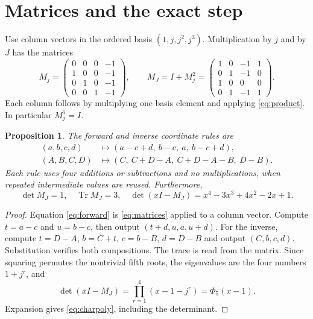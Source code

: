 \documentclass[11pt,a4paper]{article}
\newtheorem{proposition}{Proposition}
\newcommand{\Tr}{\operatorname{Tr}}
\begin{document}
\section{Matrices and the exact step}\label{sec:step}
Use column vectors in the ordered basis $(1,j,j^2,j^3)$. Multiplication
by $j$ and by $J$ has the matrices
\begin{equation}\label{eq:matrices}
 M_j=\begin{pmatrix}
 0&0&0&-1\\1&0&0&-1\\0&1&0&-1\\0&0&1&-1
 \end{pmatrix},\qquad
 M_J=I+M_j^2=\begin{pmatrix}
 1&0&-1&1\\0&1&-1&0\\1&0&0&0\\0&1&-1&1
 \end{pmatrix}.
\end{equation}
Each column follows by multiplying one basis element and applying
\eqref{eq:product}. In particular $M_j^5=I$.

\begin{proposition}\label{prop:step}
The forward and inverse coordinate rules are
\begin{align}
 (a,b,c,d)&\longmapsto(a-c+d,\ b-c,\ a,\ b-c+d),\label{eq:forward}\\
 (A,B,C,D)&\longmapsto(C,\ C+D-A,\ C+D-A-B,\ D-B).\label{eq:inverse}
\end{align}
Each rule uses four additions or subtractions and no multiplications,
when repeated intermediate values are reused. Furthermore,
\begin{equation}\label{eq:charpoly}
 \det M_J=1,\quad\Tr M_J=3,\quad
 \det(xI-M_J)=x^4-3x^3+4x^2-2x+1.
\end{equation}
\end{proposition}
\begin{proof}
Equation \eqref{eq:forward} is \eqref{eq:matrices} applied to a column
vector. Compute $t=a-c$ and $u=b-c$, then output $(t+d,u,a,u+d)$.
For the inverse, compute $t=D-A$, $b=C+t$, $c=b-B$, $d=D-B$ and
output $(C,b,c,d)$. Substitution verifies both compositions.
The trace is read from the matrix. Since squaring permutes the
nontrivial fifth roots, the eigenvalues are the four numbers
$1+j^r$, and
\[
 \det(xI-M_J)=\prod_{r=1}^4(x-1-j^r)=\Phi_5(x-1).
\]
Expansion gives \eqref{eq:charpoly}, including the determinant.
\end{proof}
\end{document}
